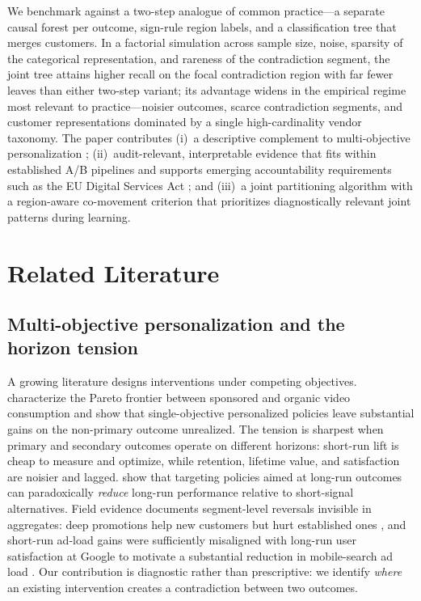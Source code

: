 \documentclass[12pt,a4paper]{article}
\begin{document}
We benchmark against a two-step analogue of common practice---a separate causal forest per outcome, sign-rule region labels, and a classification tree that merges customers. In a factorial simulation across sample size, noise, sparsity of the categorical representation, and rareness of the contradiction segment, the joint tree attains higher recall on the focal contradiction region with far fewer leaves than either two-step variant; its advantage widens in the empirical regime most relevant to practice---noisier outcomes, scarce contradiction segments, and customer representations dominated by a single high-cardinality vendor taxonomy. The paper contributes (i)~a descriptive complement to multi-objective personalization \citep{rafieian2025multiobjective}; (ii)~audit-relevant, interpretable evidence that fits within established A/B pipelines and supports emerging accountability requirements such as the EU Digital Services Act \citep{dsa2022article34, raji2020_internal_audit}; and (iii)~a joint partitioning algorithm with a region-aware co-movement criterion that prioritizes diagnostically relevant joint patterns during learning.

\section{Related Literature}
\label{sec:related}

\subsection{Multi-objective personalization and the horizon tension}

A growing literature designs interventions under competing objectives. \citet{rafieian2025multiobjective} characterize the Pareto frontier between sponsored and organic video consumption and show that single-objective personalized policies leave substantial gains on the non-primary outcome unrealized. The tension is sharpest when primary and secondary outcomes operate on different horizons: short-run lift is cheap to measure and optimize, while retention, lifetime value, and satisfaction are noisier and lagged. \citet{ascarza2024doingmore} show that targeting policies aimed at long-run outcomes can paradoxically \emph{reduce} long-run performance relative to short-signal alternatives. Field evidence documents segment-level reversals invisible in aggregates: deep promotions help new customers but hurt established ones \citep{anderson2004longrun}, and short-run ad-load gains were sufficiently misaligned with long-run user satisfaction at Google to motivate a substantial reduction in mobile-search ad load \citep{hohnhold2015focusing}. Our contribution is diagnostic rather than prescriptive: we identify \emph{where} an existing intervention creates a contradiction between two outcomes.
\end{document}
